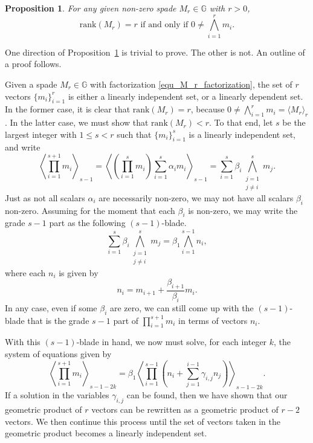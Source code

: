 \documentclass{birkjour}
\newtheorem{prop}[thm]{Proposition}
\theoremstyle{definition}
\theoremstyle{remark}
\numberwithin{equation}{section}
\newcommand{\G}{\mathbb{G}}
\newcommand{\rank}{\mbox{rank}}
\begin{document}
\begin{prop}\label{prop_spade_lin_indep}
For any given non-zero spade $M_r\in\G$ with $r>0$,
\begin{equation*}
\mbox{$\rank(M_r)=r$ if and only if $0\neq\bigwedge_{i=1}^r m_i$.}
\end{equation*}
\end{prop}

One direction of Proposition~\ref{prop_spade_lin_indep} is trivial to prove.  The other is not.  An outline of a proof follows.

Given a spade $M_r\in\G$ with factorization \eqref{equ_M_r_factorization}, the set of $r$ vectors $\{m_i\}_{i=1}^r$
is either a linearly independent set, or a linearly dependent set.  In the former case, it is clear that $\rank(M_r)=r$,
because $0\neq\bigwedge_{i=1}^r m_i=\langle M_r\rangle_r$.
In the latter case, we must show that $\rank(M_r)<r$.  To that end, let $s$ be the largest integer with $1\leq s<r$ such that
$\{m_i\}_{i=1}^s$ is a linearly independent set, and write
\begin{equation*}
\left\langle\prod_{i=1}^{s+1} m_i\right\rangle_{s-1}=\left\langle\left(\prod_{i=1}^s m_i\right)\sum_{i=1}^s\alpha_i m_i\right\rangle_{s-1} = \sum_{i=1}^s\beta_i\bigwedge_{\substack{j=1\\j\neq i}}^s m_j.
\end{equation*}
Just as not all scalars $\alpha_i$ are necessarily non-zero, we may not have all scalars $\beta_i$ non-zero.
Assuming for the moment that each $\beta_i$ is non-zero, we may write the grade $s-1$ part as the following $(s-1)$-blade.
\begin{equation*}
\sum_{i=1}^s\beta_i\bigwedge_{\substack{j=1\\j\neq i}}^s m_j = \beta_1\bigwedge_{i=1}^{s-1} n_i,
\end{equation*}
where each $n_i$ is given by
\begin{equation*}
n_i = m_{i+1}+\frac{\beta_{i+1}}{\beta_i}m_i.
\end{equation*}
In any case, even if some $\beta_i$ are zero, we can still come up with the $(s-1)$-blade that is the grade $s-1$ part of $\prod_{i=1}^{s+1} m_i$
in terms of vectors $n_i$.

With this $(s-1)$-blade in hand, we now must solve, for each integer $k$, the system of equations given by
\begin{equation}\label{equ_system}
\left\langle\prod_{i=1}^{s+1} m_i\right\rangle_{s-1-2k} = \beta_1\left\langle\prod_{i=1}^{s-1}\left(n_i+\sum_{j=1}^{i-1}\gamma_{i,j} n_j\right)\right\rangle_{s-1-2k}.
\end{equation}
If a solution in the variables $\gamma_{i,j}$ can be found, then we have shown that our geometric product of $r$ vectors can be rewritten as a geometric product of $r-2$ vectors.
We then continue this process until the set of vectors taken in the geometric product becomes a linearly independent set.
\end{document}
